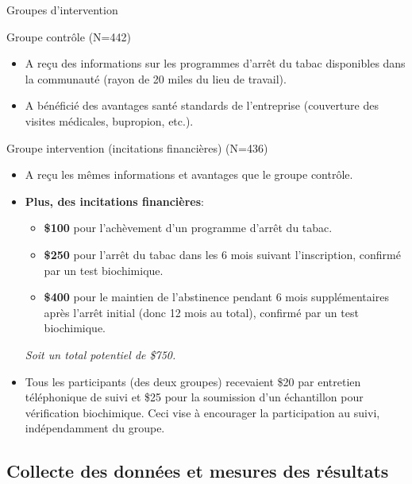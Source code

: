 \documentclass[aspectratio=169,xcolor=dvipsnames]{beamer}
\begin{document}
\begin{frame}{Groupes d'intervention}
    \begin{block}{Groupe contrôle (N=442)}
        \begin{itemize}
            \item A reçu des informations sur les programmes d'arrêt du tabac disponibles dans la communauté (rayon de 20 miles du lieu de travail).
            \item A bénéficié des avantages santé standards de l'entreprise (couverture des visites médicales, bupropion, etc.).
        \end{itemize}
    \end{block}
    \pause
    \begin{alertblock}{Groupe intervention (incitations financières) (N=436)}
        \begin{itemize}
            \item A reçu les mêmes informations et avantages que le groupe contrôle.
            \item \textbf{Plus, des incitations financières}:
                \begin{itemize}
                    \item \textbf{\$100} pour l'achèvement d'un programme d'arrêt du tabac.
                    \item \textbf{\$250} pour l'arrêt du tabac dans les 6 mois suivant l'inscription, confirmé par un test biochimique.
                    \item \textbf{\$400} pour le maintien de l'abstinence pendant 6 mois supplémentaires après l'arrêt initial (donc 12 mois au total), confirmé par un test biochimique.
                \end{itemize}
                \textit{Soit un total potentiel de \$750.}
        \end{itemize}
    \end{alertblock}
    \begin{itemize}
        \item Tous les participants (des deux groupes) recevaient \$20 par entretien téléphonique de suivi et \$25 pour la soumission d'un échantillon pour vérification biochimique. Ceci vise à encourager la participation au suivi, indépendamment du groupe.
    \end{itemize}
\end{frame}

\subsection{Collecte des données et mesures des résultats}
\end{document}
